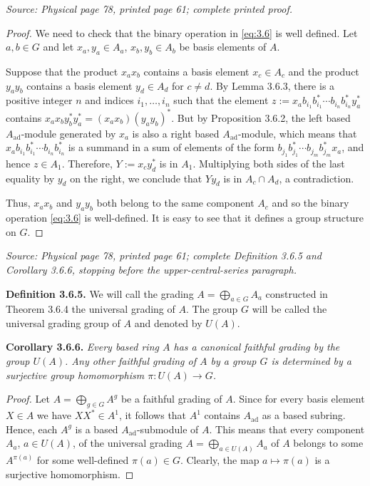 \documentclass[11pt]{article}
\newcommand{\Aad}{A_{\mathrm{ad}}}
\newcommand{\sourceloc}[1]{\par\smallskip\noindent\textit{Source: #1.}\par\nopagebreak[4]\smallskip}
\begin{document}
\sourceloc{Physical page 78, printed page 61; complete printed proof}
\begin{proof}
We need to check that the binary operation in \eqref{eq:3.6} is well defined.
Let $a,b\in G$ and let $x_a,y_a\in A_a$, $x_b,y_b\in A_b$ be basis
elements of $A$.

Suppose that the product $x_a x_b$ contains a basis element $x_c\in A_c$
and the product $y_a y_b$ contains a basis element $y_d\in A_d$ for
$c\ne d$. By Lemma 3.6.3, there is a positive integer $n$ and indices
$i_1,\ldots,i_n$ such that the element
$z:=x_a b_{i_1}b_{i_1}^*\cdots b_{i_n}b_{i_n}^*y_a^*$ contains
$x_a x_b y_b^*y_a^*=(x_a x_b)(y_a y_b)^*$.
But by Proposition 3.6.2, the left based $\Aad$-module generated by
$x_a$ is also a right based $\Aad$-module, which means that
$x_a b_{i_1}b_{i_1}^*\cdots b_{i_n}b_{i_n}^*$ is a summand in a sum of
elements of the form $b_{j_1}b_{j_1}^*\cdots b_{j_m}b_{j_m}^*x_a$,
and hence $z\in A_1$. Therefore, $Y:=x_c y_d^*$ is in $A_1$.
Multiplying both sides of the last equality by $y_d$ on the right, we
conclude that $Yy_d$ is in $A_c\cap A_d$, a contradiction.

Thus, $x_a x_b$ and $y_a y_b$ both belong to the same component $A_c$
and so the binary operation \eqref{eq:3.6} is well-defined. It is easy
to see that it defines a group structure on $G$.
\end{proof}

\sourceloc{Physical page 78, printed page 61; complete Definition 3.6.5 and Corollary 3.6.6, stopping before the upper-central-series paragraph}
\noindent\textbf{Definition 3.6.5.}
We will call the grading $A=\bigoplus_{a\in G}A_a$ constructed in
Theorem 3.6.4 the universal grading of $A$. The group $G$ will be
called the universal grading group of $A$ and denoted by $U(A)$.

\noindent\textbf{Corollary 3.6.6.}
\emph{Every based ring $A$ has a canonical faithful grading by the
group $U(A)$. Any other faithful grading of $A$ by a group $G$ is
determined by a surjective group homomorphism $\pi:U(A)\to G$.}
\begin{proof}
Let $A=\bigoplus_{g\in G}A^g$ be a faithful grading of $A$.
Since for every basis element $X\in A$ we have $XX^*\in A^1$, it
follows that $A^1$ contains $\Aad$ as a based subring.
Hence, each $A^g$ is a based $\Aad$-submodule of $A$.
This means that every component $A_a$, $a\in U(A)$, of the universal
grading $A=\bigoplus_{a\in U(A)}A_a$ of $A$ belongs to some
$A^{\pi(a)}$ for some well-defined $\pi(a)\in G$.
Clearly, the map $a\mapsto\pi(a)$ is a surjective homomorphism.
\end{proof}
\end{document}
